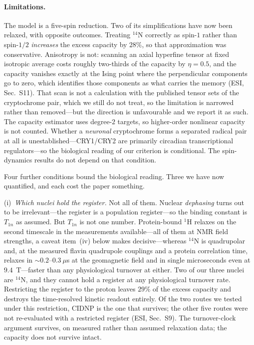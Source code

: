 \documentclass[aps,prx,reprint,superscriptaddress,nofootinbib,floatfix]{revtex4-2}
\begin{document}
\paragraph*{Limitations.}
The model is a five-spin reduction. Two of its simplifications have now been
relaxed, with opposite outcomes. Treating $^{14}$N correctly as spin-$1$ rather
than spin-$1/2$ \emph{increases} the excess capacity by $28\%$, so that
approximation was conservative. Anisotropy is not: scanning an axial hyperfine
tensor at fixed isotropic average costs roughly two-thirds of the capacity by
$\eta=0.5$, and the capacity vanishes exactly at the Ising point where the
perpendicular components go to zero, which identifies those components as what
carries the memory (ESI, Sec.~S11). That scan is not a
calculation with the published tensor sets of the cryptochrome
pair\cite{Lee2014,Schleicher2021}, which we still do not treat, so the limitation
is narrowed rather than removed---but the direction is unfavourable and we report
it as such. The capacity estimator uses
degree-$2$ targets, so higher-order nonlinear capacity is not counted. Whether a
\emph{neuronal} cryptochrome forms a separated radical pair at all is
unestablished---CRY1/CRY2 are primarily circadian transcriptional
regulators\cite{Partch2014}---so the biological reading of our criterion is
conditional. The spin-dynamics results do not depend on that condition.

Four further conditions bound the biological reading. Three we have now
quantified, and each cost the paper something.

(i)~\emph{Which nuclei hold the register.} Not all of them. Nuclear
\emph{dephasing} turns out to be irrelevant---the register is a population
register---so the binding constant is $T_{1n}$ as assumed. But $T_{1n}$ is not
one number. Protein-bound $^1$H relaxes on the second timescale in the
measurements available\cite{Tjandra1995}---all of them at NMR field strengths, a
caveat item~(iv) below makes decisive---whereas $^{14}$N is quadrupolar and, at
the measured flavin quadrupole couplings and a protein correlation time, relaxes
in $\sim0.2$--$0.3~\mu$s at the geomagnetic field and in single microseconds even
at $9.4$~T\cite{Sunde2010,Goddard2009}---faster than any physiological turnover at
either. Two of our three nuclei are
$^{14}$N, and they cannot hold a register at any physiological turnover rate.
Restricting the register to the proton leaves $29\%$ of the excess capacity and
destroys the time-resolved kinetic readout entirely. Of the two routes we tested
under this restriction, CIDNP is the one that survives; the other five routes were
not re-evaluated with a restricted register (ESI, Sec.~S9). The turnover-clock argument
survives, on measured rather than assumed relaxation data; the capacity does not
survive intact.
\end{document}
